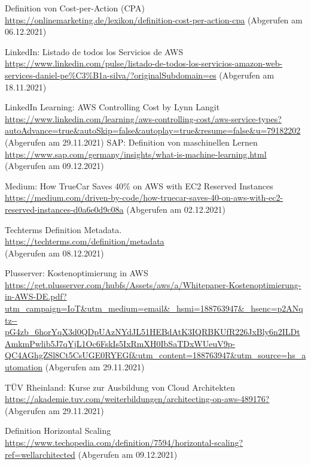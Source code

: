 \begin{thebibliography}{HR08}
  Definition von Cost-per-Action (CPA)\\
 \url{https://onlinemarketing.de/lexikon/definition-cost-per-action-cpa}
 (Abgerufen am 06.12.2021)
 
  LinkedIn: Listado de todos los Servicios de AWS\\
 \url{https://www.linkedin.com/pulse/listado-de-todos-los-servicios-amazon-web-services-daniel-pe%C3%B1a-silva/?originalSubdomain=es}
 (Abgerufen am 18.11.2021)

  LinkedIn Learning: AWS Controlling Cost by Lynn Langit\\
 \url{https://www.linkedin.com/learning/aws-controlling-cost/aws-service-types?autoAdvance=true&autoSkip=false&autoplay=true&resume=false&u=79182202}
 (Abgerufen am 29.11.2021)
 SAP: Definition von maschinellen Lernen\\
 \url{https://www.sap.com/germany/insights/what-is-machine-learning.html}
 (Abgerufen am 09.12.2021)

 Medium: How TrueCar Saves 40\% on AWS with EC2 Reserved Instances\\
 \url{https://medium.com/driven-by-code/how-truecar-saves-40-on-aws-with-ec2-reserved-instances-d0a6e0d9c08a}
 (Abgerufen am 02.12.2021)
 
  Techterms Definition Metadata.\\
 \url{https://techterms.com/definition/metadata}\\
 (Abgerufen am 08.12.2021)

  Plusserver: Kostenoptimierung in AWS\\
 \url{https://get.plusserver.com/hubfs/Assets/aws/a/Whitepaper-Kostenoptimierung-in-AWS-DE.pdf?utm_campaign=IoT&utm_medium=email&_hsmi=188763947&_hsenc=p2ANqtz--pG4zb_6horYqX3d0QDpUAzNYdJL51HEBdAtK3IQRBKUfR226JxBly6n2ILDtAmkmPwlib5J7qYjL1Oc6FskIs5IxRmXH0IbSaTDxWUeuV9p-QC4AGhgZSl8Ct5CsUGE0RYEGf&utm_content=188763947&utm_source=hs_automation}
 (Abgerufen am 29.11.2021)
 
  TÜV Rheinland: Kurse zur Ausbildung von Cloud Architekten\\
 \url{https://akademie.tuv.com/weiterbildungen/architecting-on-aws-489176?}
 (Abgerufen am 29.11.2021)

   Definition Horizontal Scaling\\
 \url{https://www.techopedia.com/definition/7594/horizontal-scaling?ref=wellarchitected}
 (Abgerufen am 09.12.2021)


\end{thebibliography}
